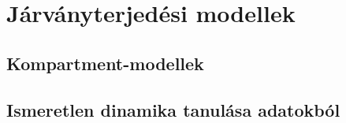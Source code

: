 \chapter{Járványterjedési modellek}
\label{ch:models}

\section{Kompartment-modellek}

\section{Ismeretlen dinamika tanulása adatokból}
